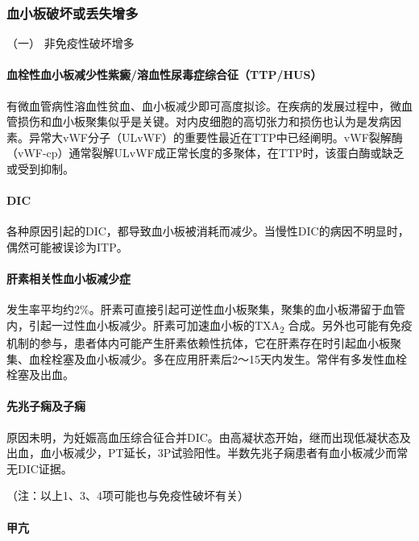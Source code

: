 \subsubsection{血小板破坏或丢失增多}

\hypertarget{text00332.htmlux5cux23CHP12-1-2-1-2-1}{}
（一） 非免疫性破坏增多

\paragraph{血栓性血小板减少性紫癜/溶血性尿毒症综合征（TTP/HUS）}

有微血管病性溶血性贫血、血小板减少即可高度拟诊。在疾病的发展过程中，微血管损伤和血小板聚集似乎是关键。对内皮细胞的高切张力和损伤也认为是发病因素。异常大vWF分子（ULvWF）的重要性最近在TTP中已经阐明。vWF裂解酶（vWF-cp）通常裂解ULvWF成正常长度的多聚体，在TTP时，该蛋白酶或缺乏或受到抑制。

\paragraph{DIC}

各种原因引起的DIC，都导致血小板被消耗而减少。当慢性DIC的病因不明显时，偶然可能被误诊为ITP。

\paragraph{肝素相关性血小板减少症}

发生率平均约2\%。肝素可直接引起可逆性血小板聚集，聚集的血小板滞留于血管内，引起一过性血小板减少。肝素可加速血小板的TXA\textsubscript{2}
合成。另外也可能有免疫机制的参与，患者体内可能产生肝素依赖性抗体，它在肝素存在时引起血小板聚集、血栓栓塞及血小板减少。多在应用肝素后2～15天内发生。常伴有多发性血栓栓塞及出血。

\paragraph{先兆子痫及子痫}

原因未明，为妊娠高血压综合征合并DIC。由高凝状态开始，继而出现低凝状态及出血，血小板减少，PT延长，3P试验阳性。半数先兆子痫患者有血小板减少而常无DIC证据。

（注：以上1、3、4项可能也与免疫性破坏有关）

\paragraph{甲亢}

